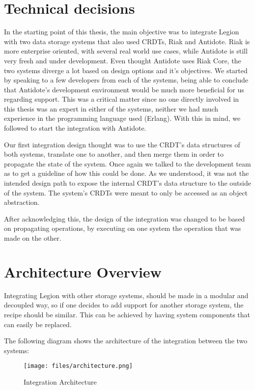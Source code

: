 \section{Technical decisions}
\label{sec:technical_decisions}
In the starting point of this thesis, the main objective was to integrate Legion with two data storage systems that also used CRDTs, Riak and Antidote. Riak is more enterprise oriented, with several real world use cases, while Antidote is still very fresh and under development. Even thought Antidote uses Riak Core, the two systems diverge a lot based on design options and it's objectives. We started by speaking to a few developers from each of the systems, being able to conclude that Antidote's development environment would be much more beneficial for us regarding support. This was a critical matter since no one directly involved in this thesis was an expert in either of the systems, neither we had much experience in the programming language used (Erlang). With this in mind, we followed to start the integration with Antidote.\par
Our first integration design thought was to use the CRDT's data structures of both systems, translate one to another, and then merge them in order to propagate the state of the system. Once again we talked to the development team as to get a guideline of how this could be done. As we understood, it was not the intended design path to expose the internal CRDT's data structure to the outside of the system. The system's CRDTs were meant to only be accessed as an object abstraction.\par
After acknowledging this, the design of the integration was changed to be based on propagating operations, by executing on one system the operation that was made on the other.


\section{Architecture Overview}
\label{sec:architecture_overview}
Integrating Legion with other storage systems, should be made in a modular and decoupled way, so if one decides to add support for another storage system, the recipe should be similar. This can be achieved by having system components that can easily be replaced.\par
	The following diagram shows the architecture of the integration between the two systems:
	
\begin{figure}[H]
\centering
\texttt{[image: files/architecture.png]}
\caption{Integration Architecture}
\label{architecture}
\end{figure}

